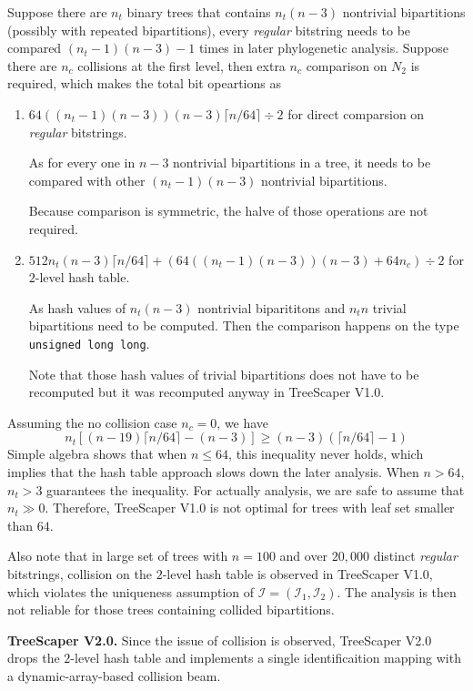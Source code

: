 \documentclass[11pt]{article}
\theoremstyle{definition}
\theoremstyle{remark}
\theoremstyle{plain}
\begin{document}
Suppose there are $n_t$ binary trees that contains $n_t(n-3)$ nontrivial bipartitions (possibly with repeated bipartitions), every \emph{regular} bitstring needs to be compared $(n_t-1)(n-3)-1$ times in later phylogenetic analysis. Suppose there are $n_c$ collisions at the first level, then extra $n_c$ comparison on $N_2$ is required, which makes the total bit opeartions as
\begin{enumerate}
	\item $64((n_t-1)(n-3))(n-3)\lceil n/64\rceil \div 2$ for direct comparsion on \emph{regular} bitstrings. 
	
	As for every one in $n-3$ nontrivial bipartitions in a tree, it needs to be compared with other $(n_t-1)(n-3)$ nontrivial bipartitions.
	
	Because comparison is symmetric, the halve of those operations are not required.
	\item $512n_t(n-3)\lceil n/64\rceil + (64((n_t-1)(n-3))(n-3) + 64n_c)\div 2$ for $2$-level hash table.

	As hash values of $n_t(n-3)$ nontrivial biparititons and $n_tn$ trivial bipartitions need to be computed. Then the comparison happens on the type \texttt{unsigned long long}.

	Note that those hash values of trivial bipartitions does not have to be recomputed but it was recomputed anyway in TreeScaper V1.0.
\end{enumerate}
Assuming the no collision case $n_c = 0$, we have 
\[
	n_t \left[(n-19)\lceil n/64\rceil - (n-3)\right] \geq (n-3)(\lceil n/64\rceil - 1)
\]
Simple algebra shows that when $n\leq 64$, this inequality never holds, which implies that the hash table approach slows down the later analysis.
When $n > 64$, $n_t > 3$ guarantees the inequality. For actually analysis, we are safe to assume that $n_t\gg 0$. Therefore, TreeScaper V1.0 is not optimal for trees with leaf set smaller than $64$.

Also note that in large set of trees with $n = 100$ and over $20,000$ distinct \emph{regular} bitstrings, collision on the $2$-level hash table is observed in TreeScaper V1.0, which violates the uniqueness assumption of $\mathcal{I} = (\mathcal{I}_1, \mathcal{I}_2)$. The analysis is then not reliable for those trees containing collided bipartitions.


\noindent\textbf{TreeScaper V2.0.} Since the issue of collision is observed, TreeScaper V2.0 drops the $2$-level hash table and implements a single identificaition mapping with a dynamic-array-based collision beam.
\end{document}
